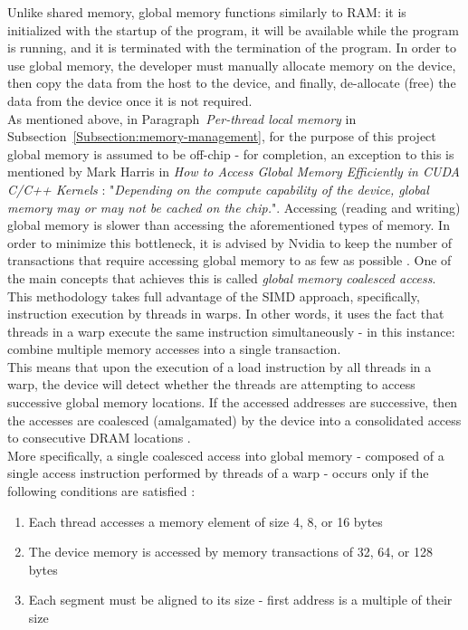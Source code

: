 Unlike shared memory, global memory functions similarly to RAM: it is initialized with the startup of the program, it will be available while the program is running, and it is terminated with the termination of the program. In order to use global memory, the developer must manually allocate memory on the device, then copy the data from the host to the device, and finally, de-allocate (free) the data from the device \cite{Harris7January2013} once it is not required. \\
As mentioned above, in Paragraph~\emph{Per-thread local memory} in Subsection~\ref{Subsection:memory-management}, for the purpose of this project global memory is assumed to be off-chip - for completion, an exception to this is mentioned by Mark Harris in \emph{How to Access Global Memory Efficiently in CUDA C/C++ Kernels} \cite{Harris7January2013}: "\textit{Depending on the compute capability of the device, global memory may or may not be cached on the chip.}". Accessing (reading and writing) global memory is slower than accessing the aforementioned types of memory. In order to minimize this bottleneck, it is advised by Nvidia to keep the number of transactions that require accessing global memory to as few as possible \cite{Harris7January2013}. One of the main concepts that achieves this is called \textit{global memory coalesced access}. This methodology takes full advantage of the SIMD approach, specifically, instruction execution by threads in warps. In other words, it uses the fact that threads in a warp execute the same instruction simultaneously - in this instance: combine multiple memory accesses into a single transaction. \\
This means that upon the execution of a load instruction by all threads in a warp, the device will detect whether the threads are attempting to access successive global memory locations. If the accessed addresses are successive, then the accesses are coalesced (amalgamated) by the device into a consolidated access to consecutive DRAM locations \cite{Cabrera4December2019}. \\
More specifically, a single coalesced access into global memory - composed of a single access instruction performed by threads of a warp - occurs only if the following conditions are satisfied \cite{xUOrKLpxlGjvTonr, NVIDIAMay2022}:

\begin{enumerate}\label{Enumerate:CUDA-global-memory-coalesced-access-requirements}
	\item Each thread accesses a memory element of size 4, 8, or 16 bytes
	\item The device memory is accessed by memory transactions of 32, 64, or 128 bytes
	\item Each segment must be aligned to its size - first address is a multiple of their size
\end{enumerate}

